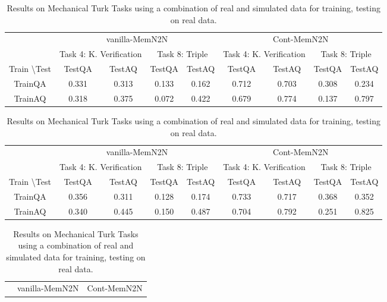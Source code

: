 \begin{table}[h]
\centering
\scriptsize
\begin{tabular}{ccccccccc}\toprule
&\multicolumn{4}{c}{vanilla-MemN2N}&\multicolumn{4}{c}{Cont-MemN2N} \\\cmidrule{2-5}\cmidrule{6-9}
&\multicolumn{2}{c}{Task 4: K. Verification}&\multicolumn{2}{c}{Task 8: Triple}
&\multicolumn{2}{c}{Task 4: K. Verification}&\multicolumn{2}{c}{Task 8: Triple}  \\\cmidrule{2-3}\cmidrule{4-5}\cmidrule{6-7}\cmidrule{8-9}
Train \textbackslash Test &TestQA&TestAQ &TestQA&TestAQ &TestQA&TestAQ &TestQA&TestAQ\\
TrainQA & 0.331 & 0.313  & 0.133 & 0.162 & 0.712  & 0.703  & 0.308 & 0.234\\
TrainAQ & 0.318 & 0.375  & 0.072 & 0.422 & 0.679  & 0.774  & 0.137 & 0.797 \\\bottomrule
\end{tabular}
\caption{Mechanical Turk Task Results, using real data for training and testing.
\label{res:mturk_main}}
\vspace{1cm}
\centering
\scriptsize
\begin{tabular}{ccccccccc}\toprule
&\multicolumn{4}{c}{vanilla-MemN2N}&\multicolumn{4}{c}{Cont-MemN2N} \\\cmidrule{2-5}\cmidrule{6-9}
&\multicolumn{2}{c}{Task 4: K. Verification}&\multicolumn{2}{c}{Task 8: Triple}
&\multicolumn{2}{c}{Task 4: K. Verification}&\multicolumn{2}{c}{Task 8: Triple}  \\\cmidrule{2-3}\cmidrule{4-5}\cmidrule{6-7}\cmidrule{8-9}
Train \textbackslash Test &TestQA&TestAQ &TestQA&TestAQ &TestQA&TestAQ &TestQA&TestAQ\\
TrainQA & 0.356 & 0.311  & 0.128 & 0.174 & 0.733  & 0.717  & 0.368 & 0.352\\
TrainAQ & 0.340 & 0.445  & 0.150 & 0.487 & 0.704  & 0.792  & 0.251 & 0.825 \\\bottomrule
\end{tabular}
\caption{Results on Mechanical Turk Tasks using a combination of real and simulated data for training,
testing on real data.
\label{res:mturk_main2}}
\vspace{1cm}
\centering
\scriptsize
\begin{tabular}{ccccccccc}\toprule
&\multicolumn{4}{c}{vanilla-MemN2N}&\multicolumn{4}{c}{Cont-MemN2N} \\\cmidrule{2-5}\cmidrule{6-9}

\end{tabular}
\end{table}

